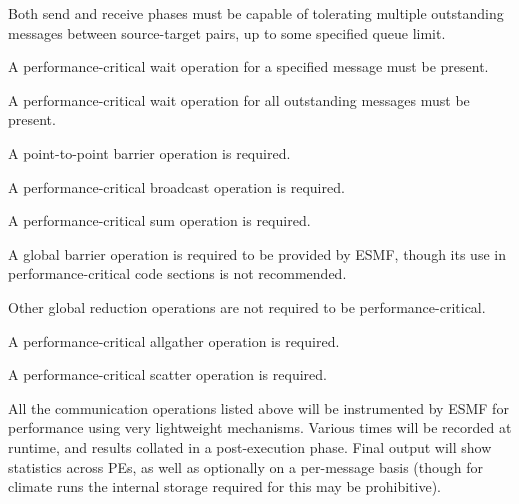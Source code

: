 
Both send and receive phases must be capable of tolerating multiple
outstanding messages between source-target pairs, up to some specified
queue limit.


A performance-critical wait operation for a specified message must be present.


A performance-critical wait operation for all outstanding messages must be present.


A point-to-point barrier operation is required.



A performance-critical broadcast operation is required.


A performance-critical sum operation is required.


A global barrier operation is required to be provided by ESMF, though
its use in performance-critical code sections is not recommended.


Other global reduction operations are not required to be performance-critical.


A performance-critical allgather operation is required.


A performance-critical scatter operation is required.


All the communication operations listed above will be instrumented by
ESMF for performance using very lightweight mechanisms. Various times
will be recorded at runtime, and results collated in a post-execution
phase. Final output will show statistics across PEs, as well as
optionally on a per-message basis (though for climate runs the
internal storage required for this may be prohibitive).


